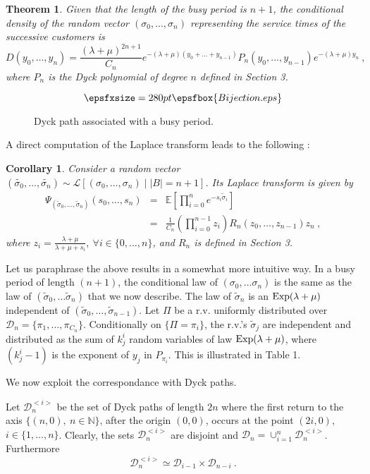 \documentclass[11pt,a4paper]{article}
\numberwithin{equation}{section}
\newtheorem{cor}[prop]{Corollary}
\newtheorem{thm}[prop]{Theorem}
\newcommand{\mrm}[1]{\text{\rm #1}}
\newcommand{\D}{\mathcal{D}}
\newcommand{\1}{\mathbbm{1}}
\newcommand{\E}{\mathbb{E}}
\newcommand{\N}{\mathbb{N}}
\newcommand{\Lom}{\mathcal{L}}
\begin{document}
\begin{thm}\label{main}
Given that the length of the busy period is $n+1$,
the conditional density of the random vector
$(\sigma_0,\dots,\sigma_{n})$ representing the service
times of the successive customers is
\begin{equation}
D(y_0,\dots,y_n)=\frac{(\lambda+\mu)^{2n+1}}{C_n} e^{- (\lambda + \mu) (y_0+\dots+y_{n-1})}
P_n(y_0,\dots,y_{n-1})e^{-(\lambda + \mu) y_n}\:,
\end{equation}
where $P_n$ is the Dyck polynomial of
degree $n$ defined in Section 3.
\end{thm}
\begin{figure}[h]
\[\epsfxsize=280pt \epsfbox{Bijection.eps} \]
\caption{Dyck path associated with a busy period.}
\label{bijec}
\end{figure}
A direct computation of the Laplace transform leads to the following :
\begin{cor}\label{Laplace trans}
Consider a random vector
$(\tilde{\sigma_0},\dots,\tilde{\sigma_{n}})\sim\Lom[(\sigma_0,\dots,\sigma_n)\mid|B|=n+1]$.
Its Laplace transform is given by
\begin{eqnarray}
\Psi_{(\tilde{\sigma}_0,\dots,\tilde{\sigma}_{n})}(s_0,\dots,s_n)&=& \E [ \prod_{i=0}^n
e^{-s_i \tilde{\sigma}_i} ]\\\label{Laplace}
&=&\frac{1}{C_n}(\prod_{i=0}^{n-1} z_i) R_n(z_0,\dots,z_{n-1})z_n\:,
\end{eqnarray}
where $z_i = \frac{\lambda+\mu}{ \lambda + \mu + s_i},\: \forall i \in
\{0,\dots,n\}$, and $R_n$ is defined in Section 3.
\end{cor}
Let us paraphrase the above results in a somewhat more intuitive way.
In a busy period of length $(n+1)$, the conditional law of
$(\sigma_0,\dots \sigma_{n})$ is the same as the law of
$(\tilde{\sigma}_0,\dots \tilde{\sigma}_{n})$ that we now describe.
The law of $\tilde{\sigma}_{n}$ is an $\mrm{Exp}(\lambda+\mu)$ independent of
$(\tilde{\sigma}_0,\dots ,\tilde{\sigma}_{n-1})$. Let $\Pi$ be a
r.v. uniformly distributed over $\D_n=\{\pi_1,\dots
,\pi_{C_n}\}$. Conditionally on $\{\Pi=\pi_i\}$, the r.v.'s $\tilde{\sigma}_j$
are independent and distributed as the sum of $k_j^i$ random variables of law
$\mrm{Exp}(\lambda+\mu)$, where $(k_j^i-1)$ is the exponent of $y_j$
in $P_{\pi_i}$. This is illustrated in Table 1.

We now exploit the correspondance with Dyck paths.

Let $\D_n^{<i>}$ be the set of Dyck paths of length $2n$ where the
first return to the axis $\{(n,0),\: n \in \N\}$, after the origin
$(0,0)$, occurs at the point $(2i,0)$, $i\in \{1,\dots,n\}$. Clearly, the sets  $\D_n^{<i>}$
are disjoint and $\D_n= \cup_{i=1}^{n}\D_n^{<i>}$. Furthermore
\begin{equation}\label{bijection}
\D_n^{<i>} \simeq \D_{i-1} \times \D_{n-i}\:.
\end{equation}
\end{document}
